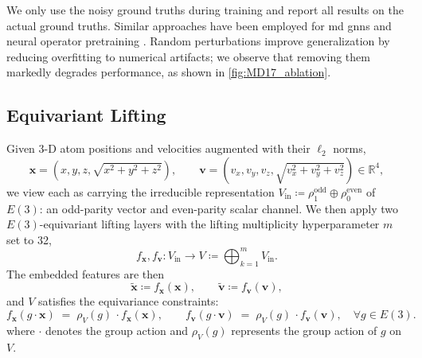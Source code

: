 We only use the noisy ground truths during training and report all results on the actual ground truths. Similar approaches have been employed for \gls{md} \glspl{gnn} and neural operator pretraining \cite{dauparas_robust_2022, zhou2024strategies, hao2024dpot}. Random perturbations improve generalization by reducing overfitting to numerical artifacts; we observe that removing them markedly degrades performance, as shown in \cref{fig:MD17_ablation}.

\subsection{Equivariant Lifting}
\label{sec:equivariant_lifting}
Given 3-D atom positions and velocities augmented with their \(\ell_2\) norms,
\begin{equation}
    \mathbf{x} = (x,y,z,\sqrt{x^2+y^2+z^2}), \qquad \mathbf{v} = (v_x, v_y, v_z, \sqrt{v_x^2+v_y^2+v_z^2}) \in \mathbb{R}^4,
\end{equation}
we view each as carrying the irreducible representation \(V_{\text{in}} \coloneqq \rho^{\text{odd}}_1 \oplus \rho^{\text{even}}_0\) of \(E(3)\): an odd-parity vector and even-parity scalar channel. We then apply two \(E(3)\)-equivariant lifting layers with the lifting multiplicity hyperparameter \(m\) set to 32,
\begin{equation}
    f_{\mathbf{x}},f_{\mathbf{v}} \colon V_{\text{in}}\longrightarrow V \coloneqq \bigoplus_{k=1}^mV_{\text{in}}.
\end{equation}
The embedded features are then
\begin{equation}
    \tilde{\mathbf{x}} \coloneqq f_{\mathbf{x}}(\mathbf{x}),
    \qquad
    \tilde{\mathbf{v}} \coloneqq f_{\mathbf{v}}(\mathbf{v}),
\end{equation}
and \(V\) satisfies the equivariance constraints:
\begin{equation}
    f_{\mathbf{x}}(g\!\cdot\!\mathbf{x}) \;=\; \rho_V(g)\, \cdot f_{\mathbf{x}}(\mathbf{x}),
    \qquad
    f_{\mathbf{v}}(g\!\cdot\!\mathbf{v}) \;=\; \rho_V(g)\, \cdot f_{\mathbf{v}}(\mathbf{v}), 
    \quad 
    \forall g \in E(3).
\end{equation}
where $\cdot$ denotes the group action and $\rho_V(g)$ represents the group action of $g$ on $V$. 

